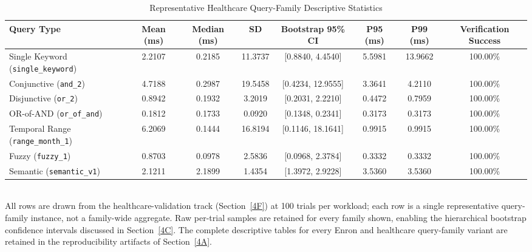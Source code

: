 \begin{table}[t]
\caption{Representative Healthcare Query-Family Descriptive Statistics}
\label{tab:query_performance}
\centering
\begin{tabular}{lccccccc}
\toprule
\textbf{Query Type} &
\textbf{Mean (ms)} &
\textbf{Median (ms)} &
\textbf{SD} &
\textbf{Bootstrap 95\% CI} &
\textbf{P95 (ms)} &
\textbf{P99 (ms)} &
\textbf{Verification Success}\\
\midrule
Single Keyword (\texttt{single\_keyword}) & 2.2107 & 0.2185 & 11.3737 & [0.8840, 4.4540] & 5.5981 & 13.9662 & 100.00\%\\
Conjunctive (\texttt{and\_2}) & 4.7188 & 0.2987 & 19.5458 & [0.4234, 12.9555] & 3.3641 & 4.2110 & 100.00\%\\
Disjunctive (\texttt{or\_2}) & 0.8942 & 0.1932 & 3.2019 & [0.2031, 2.2210] & 0.4472 & 0.7959 & 100.00\%\\
OR-of-AND (\texttt{or\_of\_and}) & 0.1812 & 0.1733 & 0.0920 & [0.1348, 0.2341] & 0.3173 & 0.3173 & 100.00\%\\
Temporal Range (\texttt{range\_month\_1}) & 6.2069 & 0.1444 & 16.8194 & [0.1146, 18.1641] & 0.9915 & 0.9915 & 100.00\%\\
Fuzzy (\texttt{fuzzy\_1}) & 0.8703 & 0.0978 & 2.5836 & [0.0968, 2.3784] & 0.3332 & 0.3332 & 100.00\%\\
Semantic (\texttt{semantic\_v1}) & 2.1211 & 2.1899 & 1.4354 & [1.3972, 2.9228] & 3.5360 & 3.5360 & 100.00\%\\
\bottomrule
\end{tabular}
\\[2pt]
\footnotesize All rows are drawn from the healthcare-validation track (Section~\ref{4F}) at 100 trials per workload; each row is a single representative query-family instance, not a family-wide aggregate. Raw per-trial samples are retained for every family shown, enabling the hierarchical bootstrap confidence intervals discussed in Section~\ref{4C}. The complete descriptive tables for every Enron and healthcare query-family variant are retained in the reproducibility artifacts of Section~\ref{4A}.
\end{table}


